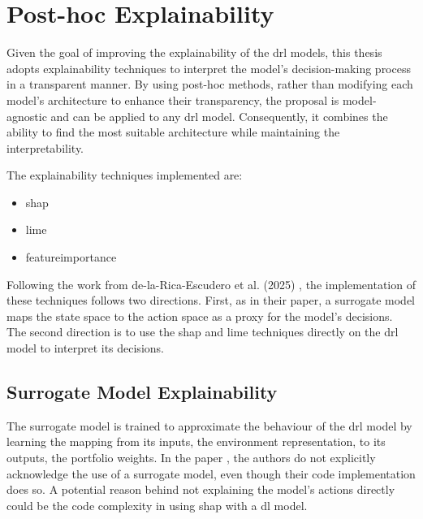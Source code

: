 \section{Post-hoc Explainability} \label{sec:post_hoc_explainability}

Given the goal of improving the explainability of the \acrshort{drl} models, this thesis adopts explainability techniques to interpret the model's decision-making process in a transparent manner. By using post-hoc methods, rather than modifying each model's architecture to enhance their transparency, the proposal is model-agnostic and can be applied to any \acrshort{drl} model. Consequently, it combines the ability to find the most suitable architecture while maintaining the interpretability.

The explainability techniques implemented are: 
\begin{itemize}
    \item \acrfull{shap}
    \item \acrfull{lime}
    \item \Gls{featureimportance}
\end{itemize}

Following the work from de-la-Rica-Escudero et al. (2025) \cite{de-La-Rica-Escudero2025}, the implementation of these techniques follows two directions. First, as in their paper, a surrogate model maps the state space to the action space as a proxy for the model's decisions. The second direction is to use the \acrshort{shap} and \acrshort{lime} techniques directly on the \acrshort{drl} model to interpret its decisions.

\subsection{Surrogate Model Explainability} \label{subsec:surrogate_model_explainability}

The surrogate model is trained to approximate the behaviour of the \acrshort{drl} model by learning the mapping from its inputs, the environment representation, to its outputs, the portfolio weights. In the paper \cite{de-La-Rica-Escudero2025}, the authors do not explicitly acknowledge the use of a surrogate model, even though their code implementation does so. A potential reason behind not explaining the model's actions directly could be the code complexity in using \acrshort{shap} with a \acrshort{dl} model. 

